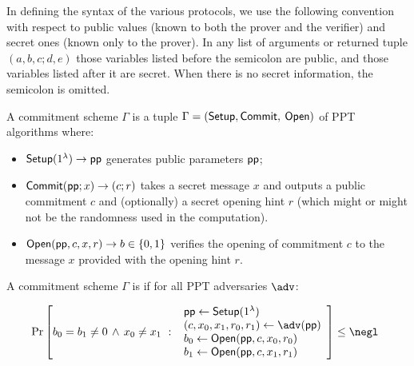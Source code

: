 In defining the syntax of the various protocols, we use the following convention with respect to public values (known to both the prover and the verifier) and secret ones (known only to the prover). In any list of arguments or returned tuple $(a, b, c; d, e)$ those variables listed before the semicolon are public, and those variables listed after it are secret. When there is no secret information, the semicolon is omitted.

\begin{definition}
A commitment scheme $\Gamma$ is a tuple $\Gamma = (\textsf{{Setup}}, \textsf{{Commit}},$ $\textsf{{Open}})$ of PPT algorithms where:
\begin{itemize}
    \item $\textsf{{Setup}}(1^\lambda) \rightarrow \textsf{pp}$ generates public parameters $\textsf{pp}$;
    \item $\textsf{{Commit}}(\textsf{pp}; x) \rightarrow (c; r)$ takes a secret message $x$ and outputs a public commitment $c$ and (optionally) a secret opening hint $r$ (which might or might not be the randomness used in the computation).
    \item $\textsf{{Open}}(\textsf{pp}, c, x, r) \rightarrow b \in \{0, 1\}$ verifies the opening of commitment $c$ to the message $x$ provided with the opening hint $r$. 
\end{itemize}

A commitment scheme $\Gamma$ is  if for all PPT adversaries $\adv$:
\begin{small}
\[
    \Pr\left[
        b_0 = b_1 \neq 0 \, \wedge \, x_0 \neq x_1 \ : \
        \begin{array}{l}
             \params \gets \pro{Setup}(1^\lambda) \\
             (c, x_0, x_1, r_0, r_1) \gets \adv(\params) \\
             b_0 \gets \pro{Open}(\params, c, x_0, r_0) \\
             b_1 \gets \pro{Open}(\params, c, x_1, r_1) \\
        \end{array}
    \right] \leq \negl \enspace 
\]
\end{small}
\begin{comment}
A commitment scheme $\Gamma$ is \defn{hiding} if for all probabilistic polynomial time adversaries $\adv=(\adv_0,\adv_1)$,
\[
    \left|
        1 - 2\Pr\left[
            \hat{b} = b \ : \
        \begin{array}{l}
             \params \gets \pro{Setup}(1^\lambda) \\
             (\state, x_0, x_1) \gets \adv_0(\params) \\
             b \sample \{0,1\} \\
             (\gr{C}; *) \gets \pro{Commit}(\params; x_b) \\
             \hat{b} \gets \adv_1(\state, \gr{C})
        \end{array}
        \right]
    \right| \leq \negl \enspace .
\]
\end{comment}
\end{definition}

